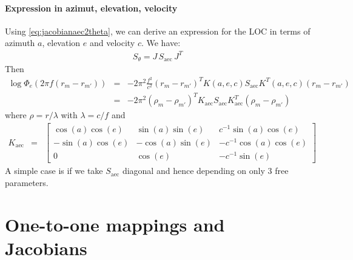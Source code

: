 \documentclass[a4paper, 12pt]{report}
\def\aec{\mathrm{aec}}
\begin{document}
\subsubsection{Expression in azimut, elevation, velocity}
Using \eqref{eq:jacobianaec2theta}, we can derive an expression for the LOC in terms of azimuth $a$, elevation $e$ and velocity $c$. We have:
\begin{eqnarray}
\label{eq:theta2aec}
S_{\theta}=J\,S_{\aec}\,J^{T}
\end{eqnarray}
Then
\begin{eqnarray*}
 \log \Phi_{e}(2\pi f(r_{m}-r_{m'}))&=& 
-2\pi^2\frac{f^2}{c^2} (r_{m}-r_{m'})^TK(a,e,c)S_{\aec}K^T(a,e,c)(r_{m}-r_{m'})
\\
&=&
-2\pi^2(\rho_{m}-\rho_{m'})^TK_{\aec}S_{\aec}K^T_{\aec}(\rho_{m}-\rho_{m'})
\end{eqnarray*}
where $\rho=r/\lambda$ with $\lambda=c/f$ and
\begin{eqnarray*}
K_{\aec}&=&
\begin{bmatrix}
\cos(a)\cos(e)&\sin(a)\sin(e)&c^{-1}\sin(a)\cos(e)
\\
-\sin(a)\cos(e)&-\cos(a)\sin(e)&-c^{-1}\cos(a)\cos(e)
\\
0&\cos(e)&-c^{-1}\sin(e)
\end{bmatrix}
\end{eqnarray*}
A simple case is if we take $S_{\aec}$ diagonal and hence depending on only 3 free parameters. 







\chapter{One-to-one mappings and Jacobians}
\end{document}
